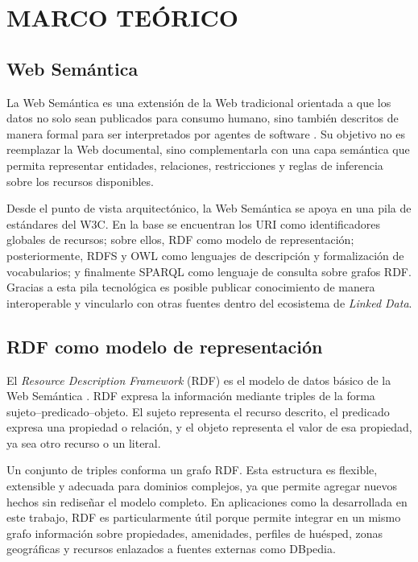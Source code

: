 \section{MARCO TEÓRICO}

\subsection{Web Semántica}

La Web Semántica es una extensión de la Web tradicional orientada a que los datos no
solo sean publicados para consumo humano, sino también descritos de manera formal para
ser interpretados por agentes de software \parencite{berners-lee2001}. Su objetivo no
es reemplazar la Web documental, sino complementarla con una capa semántica que permita
representar entidades, relaciones, restricciones y reglas de inferencia sobre los
recursos disponibles.

Desde el punto de vista arquitectónico, la Web Semántica se apoya en una pila de
estándares del W3C. En la base se encuentran los URI como identificadores globales de
recursos; sobre ellos, RDF como modelo de representación; posteriormente, RDFS y OWL
como lenguajes de descripción y formalización de vocabularios; y finalmente SPARQL
como lenguaje de consulta sobre grafos RDF. Gracias a esta pila tecnológica es posible
publicar conocimiento de manera interoperable y vincularlo con otras fuentes dentro del
ecosistema de \textit{Linked Data}.

\subsection{RDF como modelo de representación}

El \textit{Resource Description Framework} (RDF) es el modelo de datos básico de la Web
Semántica \parencite{w3c-rdf2014}. RDF expresa la información mediante triples de la
forma sujeto--predicado--objeto. El sujeto representa el recurso descrito, el
predicado expresa una propiedad o relación, y el objeto representa el valor de esa
propiedad, ya sea otro recurso o un literal.

Un conjunto de triples conforma un grafo RDF. Esta estructura es flexible, extensible y
adecuada para dominios complejos, ya que permite agregar nuevos hechos sin rediseñar el
modelo completo. En aplicaciones como la desarrollada en este trabajo, RDF es
particularmente útil porque permite integrar en un mismo grafo información sobre
propiedades, amenidades, perfiles de huésped, zonas geográficas y recursos enlazados a
fuentes externas como DBpedia.

